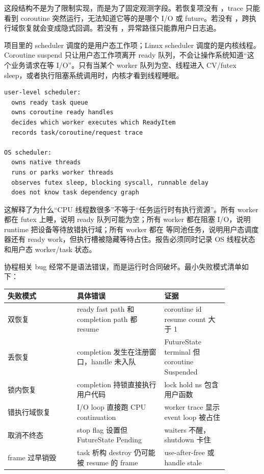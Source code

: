 这段结构不是为了限制实现，而是为了固定观测字段。若恢复项没有 ，trace 只能看到 coroutine 突然运行，无法知道它等的是哪个 I/O 或 future。若没有 ，跨执行域恢复就会变成隐式回调。若没有 ，异常路径只能靠用户日志追。

项目里的 scheduler 调度的是用户态工作项；Linux scheduler 调度的是内核线程。Coroutine suspend 只让用户态工作项离开 ready 队列，不会让操作系统知道“这个业务请求在等 I/O”。只有当某个 worker 队列为空、线程进入 CV/futex sleep，或者执行阻塞系统调用时，内核才看到线程睡眠。

\begin{lstlisting}[numbers=none,caption={两层调度器的边界}]
user-level scheduler:
  owns ready task queue
  owns coroutine ready handles
  decides which worker executes which ReadyItem
  records task/coroutine/request trace

OS scheduler:
  owns native threads
  runs or parks worker threads
  observes futex sleep, blocking syscall, runnable delay
  does not know task dependency graph
\end{lstlisting}

这解释了为什么“CPU 线程数很多”不等于“任务运行时有执行资源”。所有 worker 都在 futex 上睡，说明 ready 队列可能为空；所有 worker 都在阻塞 I/O，说明 runtime 把设备等待放错执行域；所有 worker 都在  等同池任务，说明用户态调度器还有 ready work，但执行槽被隐藏等待占住。报告必须同时记录 OS 线程状态和用户态 worker/task 状态。

协程相关 bug 经常不是语法错误，而是运行时合同破坏。最小失败模式清单如下：

\begin{center}
\small
\begin{tabular}{p{0.27\linewidth}p{0.34\linewidth}p{0.25\linewidth}}
\toprule
失败模式 & 具体错误 & 证据 \\
\midrule
双恢复 & ready fast path 和 completion path 都 resume & coroutine id resume count 大于 1 \\
丢恢复 & completion 发生在注册窗口，handle 未入队 & FutureState terminal 但 coroutine Suspended \\
锁内恢复 & completion 持锁直接执行用户代码 & lock hold ns 包含用户函数 \\
错执行域恢复 & I/O loop 直接跑 CPU continuation & worker trace 显示 event loop 被占住 \\
取消不终态 & stop flag 设置但 FutureState Pending & waiters 不醒，shutdown 卡住 \\
frame 过早销毁 & task 析构 destroy 仍可能被 resume 的 frame & use-after-free 或 handle stale \\
\bottomrule
\end{tabular}
\end{center}

